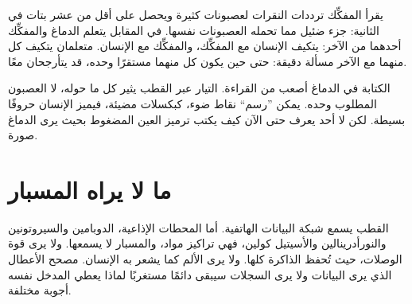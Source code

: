 يقرأ المفكِّك ترددات النقرات لعصبونات كثيرة ويحصل على أقل من عشر بتات في الثانية: جزء ضئيل مما تحمله العصبونات نفسها. في المقابل يتعلم الدماغ والمفكِّك أحدهما من الآخر: يتكيف الإنسان مع المفكِّك، والمفكِّك مع الإنسان. متعلمان يتكيف كل منهما مع الآخر مسألة دقيقة: حتى حين يكون كل منهما مستقرًا وحده، قد يتأرجحان معًا.

الكتابة في الدماغ أصعب من القراءة. التيار عبر القطب يثير كل ما حوله، لا العصبون المطلوب وحده. يمكن ”رسم“ نقاط ضوء، كبكسلات مضيئة، فيميز الإنسان حروفًا بسيطة. لكن لا أحد يعرف حتى الآن كيف يكتب ترميز العين المضغوط بحيث يرى الدماغ صورة.

\section*{ما لا يراه المسبار}

القطب يسمع شبكة البيانات الهاتفية. أما المحطات الإذاعية، الدوبامين والسيروتونين والنورأدرينالين والأسيتيل كولين، فهي تراكيز مواد، والمسبار لا يسمعها. ولا يرى قوة الوصلات، حيث تُحفظ الذاكرة كلها. ولا يرى الألم كما يشعر به الإنسان. مصحح الأعطال الذي يرى البيانات ولا يرى السجلات سيبقى دائمًا مستغربًا لماذا يعطي المدخل نفسه أجوبة مختلفة.

